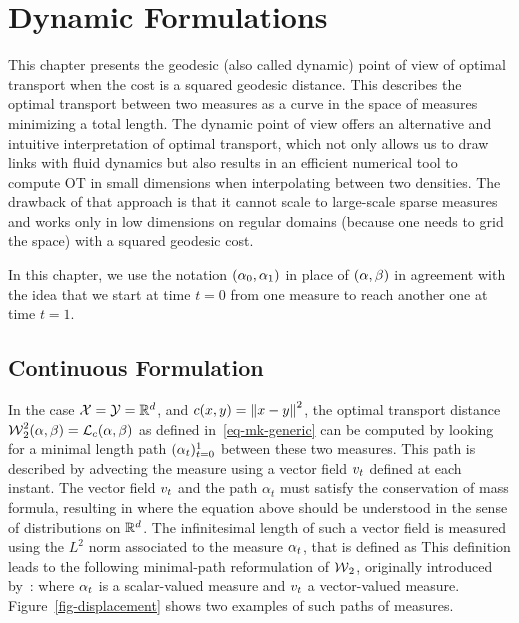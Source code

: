 
\chapter{Dynamic Formulations}
\label{c-dynamic}

This chapter presents the geodesic (also called dynamic) point of view of optimal transport when the cost is a squared geodesic distance. This describes the optimal transport between two measures as a curve in the space of measures minimizing a total length. The dynamic point of view offers an alternative and intuitive interpretation of optimal transport, which not only allows us to draw links with fluid dynamics but also results in an efficient numerical tool to compute OT in small dimensions when interpolating between two densities. The drawback of that approach is that it cannot scale to large-scale sparse measures and works only in low dimensions on regular domains (because one needs to grid the space) with a squared geodesic cost.

In this chapter, we use the notation $(\alpha_0,\alpha_1)$ in place of $(\alpha,\beta)$ in agreement with the idea that we start at time $t=0$ from one measure to reach another one at time $t=1$.

\section{Continuous Formulation}

In the case $\mathcal{X}=\mathcal{Y}=\mathbb{R}^d$, and $c(x,y)=\left\| x-y \right\|^2$, the optimal transport distance $\operatorname{\mathcal{W}}_2^2(\alpha,\beta) = \mathcal{L}_c(\alpha,\beta)$ as defined in~\eqref{eq-mk-generic} can be computed by looking for a minimal length path $(\alpha_t)_{t=0}^1$ between these two measures. 
%
This path is described by advecting the measure using a vector field $v_t$ defined at each instant. The vector field $v_t$ and the path $\alpha_t$ must satisfy the conservation of mass formula, resulting in 
where the equation above should be understood in the sense of distributions on $\mathbb{R}^d$. The infinitesimal length of such a vector field is measured using the $L^2$ norm associated to the measure $\alpha_t$, that is defined as 
This definition leads to the following minimal-path reformulation of $\operatorname{\mathcal{W}}_2$, originally introduced by~\citet{benamou2000computational}:
where $\alpha_t$ is a scalar-valued measure and $v_t$ a vector-valued measure. Figure~\ref{fig-displacement} shows two examples of such paths of measures.


